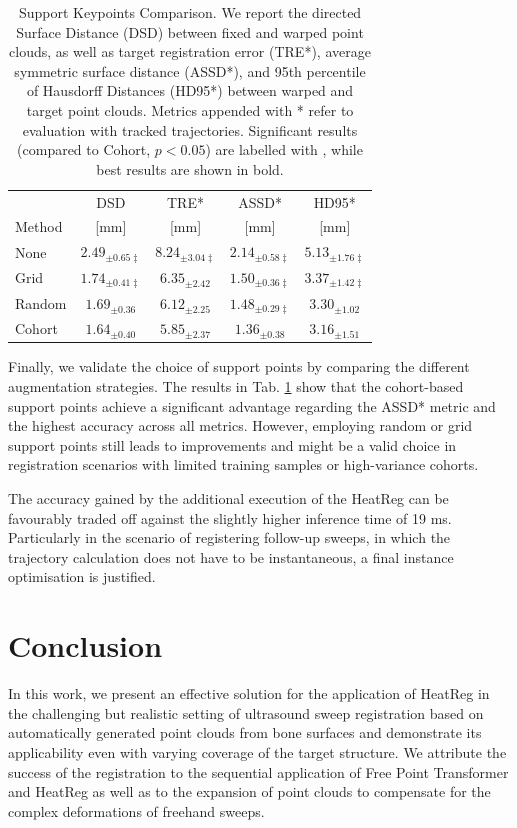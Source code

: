 \begin{table}[t]
    \centering
    \caption{Support Keypoints Comparison. We report the directed Surface Distance (DSD) between fixed and warped point clouds, as well as target registration error (TRE*), average symmetric surface distance (ASSD*), and 95th percentile of Hausdorff Distances (HD95*) between warped and target point clouds. Metrics appended with * refer to evaluation with tracked trajectories. Significant results (compared to Cohort, $p<0.05$) are labelled with \textdaggerdbl, while best results are shown in bold.}\label{tab:support_points}%
    \begin{tabular}{lcccc}
    \toprule
     & DSD & TRE* & ASSD*  & HD95* \\
    Method & [mm] & [mm] & [mm] & [mm] \\
    \midrule
None & $2.49_{\pm 0.65\ddagger}$ & $8.24_{\pm 3.04\ddagger}$ & $2.14_{\pm 0.58\ddagger}$ & $5.13_{\pm 1.76\ddagger}$ \\
Grid & $1.74_{\pm 0.41\ddagger}$ & $6.35_{\pm 2.42}$ & $1.50_{\pm 0.36\ddagger}$ & $3.37_{\pm 1.42\ddagger}$ \\
Random & $1.69_{\pm 0.36}$ & $6.12_{\pm 2.25}$ & $1.48_{\pm 0.29\ddagger}$ & $3.30_{\pm 1.02}$ \\
Cohort & $\mathbf{1.64_{\pm 0.40}}$ & $\mathbf{5.85_{\pm 2.37}}$ & $\mathbf{1.36_{\pm 0.38}}$ & $\mathbf{3.16_{\pm 1.51}}$ \\
    \bottomrule
    \end{tabular}
\end{table}

Finally, we validate the choice of support points by comparing the different augmentation strategies. The results in Tab. \ref{tab:support_points} show that the cohort-based support points achieve a significant advantage regarding the ASSD* metric and the highest accuracy across all metrics. However, employing random or grid support points still leads to improvements and might be a valid choice in registration scenarios with limited training samples or high-variance cohorts.


The accuracy gained by the additional execution of the HeatReg can be favourably traded off against the slightly higher inference time of 19 ms. Particularly in the scenario of registering follow-up sweeps, in which the trajectory calculation does not have to be instantaneous, a final instance optimisation is justified.



\section{Conclusion}
In this work, we present an effective solution for the application of HeatReg in the challenging but realistic setting of ultrasound sweep registration based on automatically generated point clouds from bone surfaces and demonstrate its applicability even with varying coverage of the target structure. We attribute the success of the registration to the sequential application of Free Point Transformer and HeatReg as well as to the expansion of point clouds to compensate for the complex deformations of freehand sweeps. 

